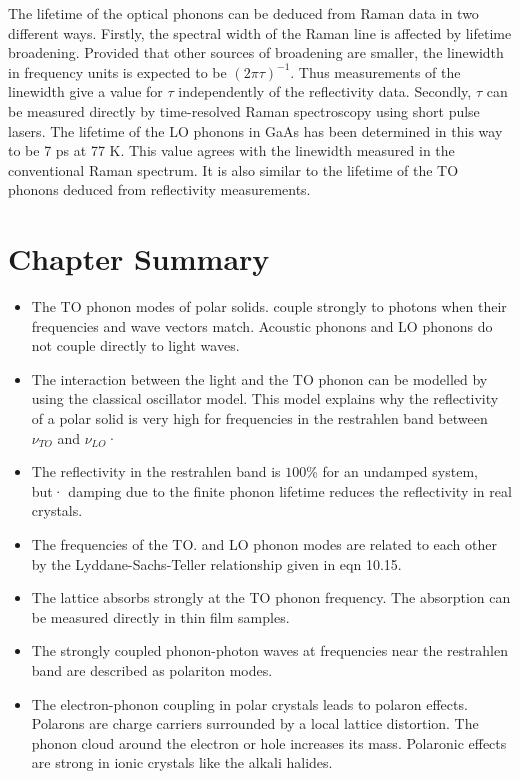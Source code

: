 \documentclass[12pt]{book}
\begin{document}
{The lifetime of the optical phonons can be deduced from Raman data in two different ways. Firstly, the spectral width of the Raman line is affected by lifetime broadening. Provided that other sources of broadening are smaller, the linewidth in frequency units is expected to be $(2\pi\tau)^{-1}$. Thus measurements of the linewidth give a value for $\tau$ independently of the reflectivity data. Secondly, $\tau$ can be measured directly by time-resolved Raman spectroscopy using short pulse lasers. The lifetime of the LO phonons in GaAs has been determined in this way to be 7 ps at 77 K. This value agrees with the linewidth measured in the conventional Raman spectrum. It is also similar to the lifetime of the TO phonons deduced from reflectivity measurements.

\section*{Chapter Summary}
\begin{shaded}
\begin{itemize}
  \item The TO phonon modes of polar solids. couple strongly to photons when their frequencies and wave vectors match. Acoustic phonons and LO phonons do not couple directly to light waves.
  \item The interaction between the light and the TO phonon can be modelled by using the classical oscillator model. This model explains why the reflectivity of a polar solid is very high for frequencies in the restrahlen band between $\nu_{TO}$ and $\nu_{LO}$·
  \item The reflectivity in the restrahlen band is $100\%$ for an undamped system, but· damping due to the finite phonon lifetime reduces the reflectivity in real crystals.
  \item The frequencies of the TO. and LO phonon modes are related to each other by the Lyddane-Sachs-Teller relationship given in eqn 10.15.
  \item The lattice absorbs strongly at the TO phonon frequency. The absorption can be measured directly in thin film samples.
  \item The strongly coupled phonon-photon waves at frequencies near the restrahlen band are described as polariton modes.
  \item The electron-phonon coupling in polar crystals leads to polaron effects. Polarons are charge carriers surrounded by a local lattice distortion. The phonon cloud around the electron or hole increases its mass. Polaronic effects are strong in ionic crystals like the alkali halides.

\end{itemize}
\end{shaded}}
\end{document}
